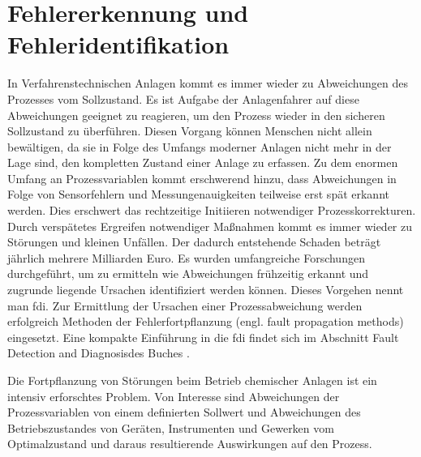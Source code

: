\section{Fehlererkennung und Fehleridentifikation}\label{sec:fAna_fdi}
In Verfahrenstechnischen Anlagen kommt es immer wieder zu Abweichungen des Prozesses vom Sollzustand. Es ist Aufgabe der Anlagenfahrer auf diese Abweichungen geeignet zu reagieren, um den Prozess wieder in den sicheren Sollzustand zu \"uberf\"uhren. Diesen Vorgang k\"onnen Menschen nicht allein bew\"altigen, da sie in Folge des Umfangs moderner Anlagen nicht mehr in der Lage sind, den kompletten Zustand einer Anlage zu erfassen. Zu dem enormen Umfang an Prozessvariablen kommt erschwerend hinzu, dass Abweichungen in Folge von Sensorfehlern und Messungenauigkeiten teilweise erst sp\"at erkannt werden. Dies erschwert das rechtzeitige Initiieren notwendiger Prozesskorrekturen. Durch versp\"atetes Ergreifen notwendiger Ma\ss{}nahmen kommt es immer wieder zu St\"orungen und kleinen Unf\"allen. Der dadurch entstehende Schaden betr\"agt j\"ahrlich mehrere Milliarden Euro. Es wurden umfangreiche Forschungen durchgef\"uhrt, um zu ermitteln wie Abweichungen fr\"uhzeitig erkannt und zugrunde liegende Ursachen identifiziert werden k\"onnen. Dieses Vorgehen nennt man \acf{fdi}. Zur Ermittlung der Ursachen einer Prozessabweichung werden erfolgreich Methoden der Fehlerfortpflanzung (engl. fault propagation methods) eingesetzt.  \cite[S. 2]{Venkatasubramanian_2003} \newline
Eine kompakte Einf\"uhrung in die \ac{fdi} findet sich im Abschnitt \glqq Fault Detection and Diagnosis\grqq { }des Buches  \cite[S. 417 ff.]{Baillieul_2015}.

Die Fortpflanzung von St\"orungen beim Betrieb chemischer Anlagen ist ein intensiv erforschtes Problem. Von Interesse sind Abweichungen der Prozessvariablen von einem definierten Sollwert und Abweichungen des Betriebszustandes von Ger\"aten, Instrumenten und Gewerken vom Optimalzustand und daraus resultierende Auswirkungen auf den Prozess.

